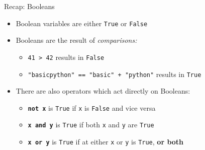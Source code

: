 \begin{frame}{Recap: Booleans}

    \begin{itemize}
        \item Boolean variables are either \texttt{True} or \texttt{False}
        \item Booleans are the result of \textit{comparisons:}

        \begin{itemize}
            \item \texttt{41 > 42} results in \texttt{False}
            \item \texttt{"basicpython" == "basic" + "python"} results in \texttt{True}
        \end{itemize}

        \item There are also operators which act directly on Booleans:

        \begin{itemize}
            \item \textbf{\texttt{not x}} is \texttt{True} if \texttt{x} is \texttt{False} and vice versa
            \item \textbf{\texttt{x and y}} is \texttt{True} if both \texttt{x} and \texttt{y} are \texttt{True}
            \item \textbf{\texttt{x or y}} is \texttt{True} if at either \texttt{x} or \texttt{y} is \texttt{True}, \textbf{or both}
        \end{itemize}

    \end{itemize}

\end{frame}
